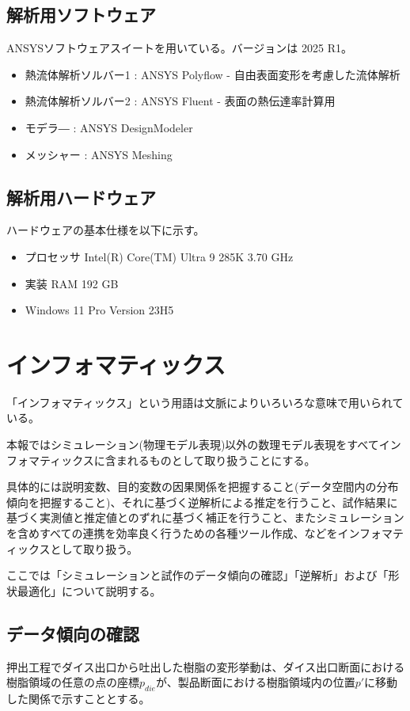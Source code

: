 \documentclass[report]{jlreq}
\begin{document}
\newpage

\subsection{解析用ソフトウェア}
ANSYSソフトウェアスイートを用いている。バージョンは 2025 R1。
\begin{itemize}
  \item 熱流体解析ソルバー1 : ANSYS Polyflow - 自由表面変形を考慮した流体解析
  \item 熱流体解析ソルバー2 : ANSYS Fluent - 表面の熱伝達率計算用
  \item モデラ― : ANSYS DesignModeler
  \item メッシャー : ANSYS Meshing
\end{itemize}



\subsection{解析用ハードウェア}
ハードウェアの基本仕様を以下に示す。

\begin{itemize}
  \item プロセッサ	Intel(R) Core(TM) Ultra 9 285K   3.70 GHz
  \item 実装 RAM	192 GB
  \item Windows 11 Pro Version 23H5
\end{itemize}



\section{インフォマティックス}
「インフォマティックス」という用語は文脈によりいろいろな意味で用いられている。

本報ではシミュレーション({\small 物理モデル表現})以外の数理モデル表現をすべてインフォマティックスに含まれるものとして取り扱うことにする。

具体的には説明変数、目的変数の因果関係を把握すること({\small データ空間内の分布傾向を把握すること})、それに基づく逆解析による推定を行うこと、試作結果に基づく実測値と推定値とのずれに基づく補正を行うこと、またシミュレーションを含めすべての連携を効率良く行うための各種ツール作成、などをインフォマティックスとして取り扱う。

ここでは「シミュレーションと試作のデータ傾向の確認」「逆解析」および「形状最適化」について説明する。

\subsection{データ傾向の確認}
押出工程でダイス出口から吐出した樹脂の変形挙動は、ダイス出口断面における樹脂領域の任意の点の座標$p_{die}$が、製品断面における樹脂領域内の位置$p'$に移動した関係で示すこととする。
\end{document}
